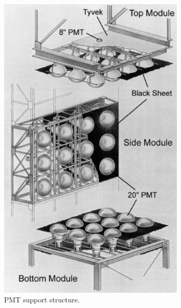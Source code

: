 \begin{figure}
\centering
\includegraphics[width=0.8\textwidth]{figures/pmt_support_structure.jpg}
\caption{PMT support structure. \cite{Fukuda:2002uc}}
\label{fig:pmt_support_structure} 
\end{figure}